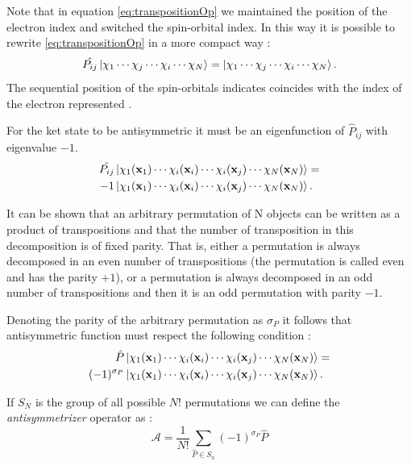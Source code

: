 \documentclass[a4paper,12pt]{article}
\begin{document}
Note that in equation \eqref{eq:transpositionOp} we maintained the position of the electron index and switched the spin-orbital index. In this way it is possible to rewrite \eqref{eq:transpositionOp} in a more compact way :
\begin{equation}
	\hat{P_{ij}}  \ket{\chi_1  \cdots  \chi_j  \cdots  \chi_i  \cdots   \chi_N} =  
		 \ket{\chi_1   \cdots  \chi_j  \cdots  \chi_i \cdots  \chi_N} .
\end{equation}
The sequential position of the spin-orbitals indicates coincides with the index of the electron represented \cite{Sakurai}.


For the ket state to be antisymmetric it must be an eigenfunction of $\hat{P}_{ij}$ with eigenvalue $-1$.
\begin{align*}
	\hat{P_{ij}} & \ket{\chi_1(\mathbf{x}_1)   \cdots  \chi_i(\mathbf{x}_i)  \cdots  \chi_i(\mathbf{x}_j)  \cdots   \chi_N(\mathbf{x}_N)} =  \\
	-1 & \ket{\chi_1(\mathbf{x}_1)   \cdots  \chi_i(\mathbf{x}_i)  \cdots  \chi_i(\mathbf{x}_j) \cdots  \chi_N(\mathbf{x}_N)} .
\end{align*}

It can be shown that an arbitrary permutation of N objects can be written as a product of transpositions and that the number of transposition in this decomposition is of fixed parity. That is, either a permutation is always decomposed in an even number of transpositions (the permutation is called even and has the parity $+1$), or a permutation is always decomposed in an odd number of transpositions and then it is an odd permutation with parity  $ - 1$.

Denoting the parity of the arbitrary permutation as $\sigma_P$ it follows that antisymmetric function must respect the following condition :
\begin{align*}
	\hat{P} & \ket{\chi_1(\mathbf{x}_1)   \cdots  \chi_i(\mathbf{x}_i)  \cdots  \chi_i(\mathbf{x}_j)  \cdots   \chi_N(\mathbf{x}_N)} = \\
	(-1)^{\sigma_P}  & \ket{\chi_1(\mathbf{x}_1)   \cdots  \chi_i(\mathbf{x}_i)  \cdots  \chi_i(\mathbf{x}_j)  \cdots   \chi_N(\mathbf{x}_N)}.
\end{align*}

If $S_N$ is the group of all possible $N!$ permutations we can define the \textit{antisymmetrizer} operator as :
\begin{equation}\label{eq:antisymmetrizer}
	\mathcal{A} = \frac{1}{N!} \sum_{\hat{P} \in S_n} (-1)^{\sigma_P} \hat{P}
\end{equation}
\end{document}
